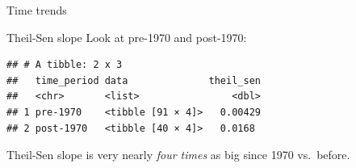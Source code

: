 \documentclass[ignorenonframetext,]{beamer}
\newenvironment{Shaded}{\begin{snugshade}}{\end{snugshade}}
\newcommand{\DataTypeTok}[1]{\textcolor[rgb]{0.13,0.29,0.53}{#1}}
\newcommand{\DecValTok}[1]{\textcolor[rgb]{0.00,0.00,0.81}{#1}}
\newcommand{\KeywordTok}[1]{\textcolor[rgb]{0.13,0.29,0.53}{\textbf{#1}}}
\newcommand{\NormalTok}[1]{#1}
\newcommand{\OperatorTok}[1]{\textcolor[rgb]{0.81,0.36,0.00}{\textbf{#1}}}
\newcommand{\StringTok}[1]{\textcolor[rgb]{0.31,0.60,0.02}{#1}}
\begin{document}
\begin{frame}[fragile]{Time trends}
\begin{block}{Theil-Sen slope}
Look at pre-1970 and post-1970:

\begin{Shaded}
\end{Shaded}

\begin{verbatim}
## # A tibble: 2 x 3
##   time_period data              theil_sen
##   <chr>       <list>                <dbl>
## 1 pre-1970    <tibble [91 × 4]>   0.00429
## 2 post-1970   <tibble [40 × 4]>   0.0168
\end{verbatim}

Theil-Sen slope is very nearly \emph{four times} as big since 1970
vs.~before.

\end{block}

\end{frame}
\end{document}
